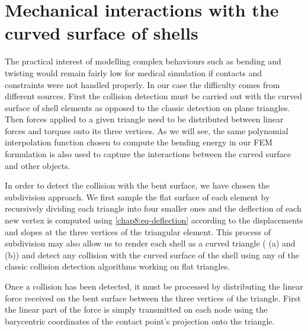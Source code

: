 \section{Mechanical interactions with the curved surface of shells}	\label{chap8:interactions}

The practical interest of modelling complex behaviours such as bending and twisting would remain fairly low for medical simulation if contacts and constraints were not handled properly. In our case the difficulty comes from different sources. First the collision detection must be carried out with the curved surface of shell elements as opposed to the classic detection on plane triangles. Then forces applied to a given triangle need to be distributed between linear forces and torques onto its three vertices. As we will see, the same polynomial interpolation function chosen to compute the bending energy in our FEM formulation is also used to capture the interactions between the curved surface and other objects. 

In order to detect the collision with the bent surface, we have chosen the subdivision approach. We first sample the flat surface of each element by recursively dividing each triangle into four smaller ones and the deflection of each new vertex is computed using \eqref{chap8:eq-deflection} according to the displacements and slopes at the three vertices of the triangular element. This process of subdivision may also allow us to render each shell as a curved triangle ( (a) and (b)) and detect any collision with the curved surface of the shell using any of the classic collision detection algorithms working on flat triangles.

Once a collision has been detected, it must be processed by distributing the linear force received on the bent surface between the three vertices of the triangle. First the linear part of the force is simply transmitted on each node using the barycentric coordinates of the contact point's projection onto the triangle. 

